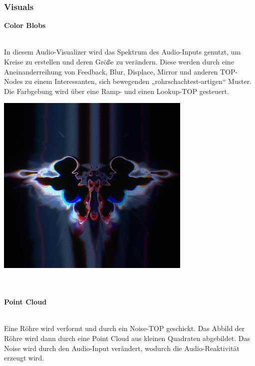 \documentclass[12pt]{scrartcl}%
\theoremstyle{nonumberplain}
\begin{document}
\newpage

\subsubsection{Visuals}

\textbf{Color Blobs}\\\\
\begin{minipage}{0.4\textwidth}
In diesem Audio-Visualizer wird das Spektrum des Audio-Inputs genutzt, um Kreise zu erstellen und deren Größe zu verändern. Diese werden durch eine Aneinanderreihung von Feedback, Blur, Displace, Mirror und anderen TOP-Nodes zu einem Interessanten, sich bewegenden „rohrschachtest-artigen“ Muster. Die Farbgebung wird über eine Ramp- und einen Lookup-TOP gesteuert.
\vspace{60pt}
\end{minipage}
\hspace{20pt}
\begin{minipage}{0.5\textwidth}
  \centering
  \includegraphics[width=\textwidth]{td_2}
\end{minipage}
\\\\
\textbf{Point Cloud}\\\\
\begin{minipage}{0.4\textwidth}
 Eine Röhre wird verformt und durch ein Noise-TOP geschickt. Das Abbild der Röhre wird dann durch 	eine Point Cloud aus kleinen Quadraten abgebildet. Das Noise wird durch den Audio-Input verändert, 	wodurch die Audio-Reaktivität erzeugt wird.
\vspace{110pt}
\end{minipage}
\end{document}
